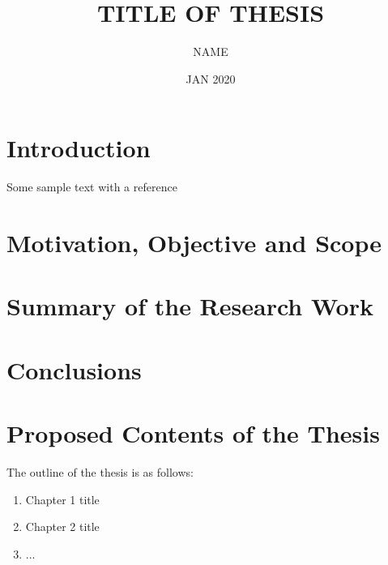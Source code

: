 \documentclass[PhD,synopsis]{iitmdiss}
\title{TITLE OF THESIS}
\author{NAME}
\date{JAN 2020}
\begin{document}
\maketitle

\setcounter{page}{0}
\section{Introduction}

Some sample text with a reference 

\section{Motivation, Objective and Scope}

\section{Summary of the Research Work}

\section{Conclusions}


\begin{singlespace}
%

\end{singlespace}

\section{Proposed Contents of the Thesis}
The outline of the thesis is as follows:
\begin{enumerate}
\item Chapter 1 title
\item Chapter 2 title
\item ...
\end{enumerate}


\end{document}

